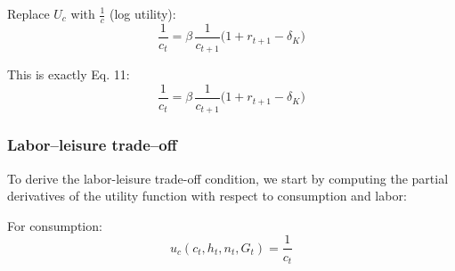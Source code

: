 Replace \(U_c\) with \(\frac{1}{c}\) (log utility):
\[
\frac{1}{c_t} = \beta\,\frac{1}{c_{t+1}}\bigl(1 + r_{t+1} - \delta_K\bigr)
\]

This is exactly Eq. 11:
\[
\boxed{\frac{1}{c_t} = \beta\,\frac{1}{c_{t+1}}\bigl(1 + r_{t+1} - \delta_K\bigr)} \tag{11}
\]











\subsubsection{Labor--leisure trade–off }

To derive the labor-leisure trade-off condition, we start by computing the partial derivatives of the utility function with respect to consumption and labor:

For consumption:
\begin{equation*}
    u_c(c_t,h_t,n_t,G_t)=\frac{1}{c_t} \tag{B1}
\end{equation*}

